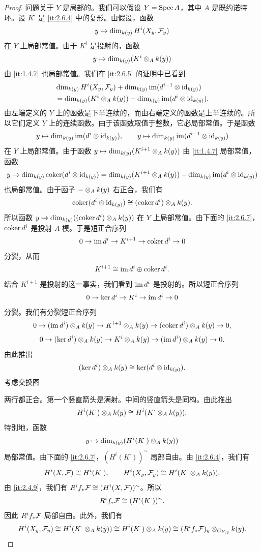 \begin{proof}
问题关于 $Y$ 是局部的。我们可以假设 $Y=\operatorname{Spec} A$，其中 $A$ 是既约诺特环。设 $K^\cdot$ 是 \ref{it:2.6.4} 中的复形。由假设，函数
\[
y\mapsto\dim_{k(y)}H^i(X_y,\mathcal{F}_y)
\]
在 $Y$ 上局部常值。由于 $K^i$ 是投射的，函数
\[
y\mapsto\dim_{k(y)}(K^i\otimes_A k(y))
\]
由 \ref{it:1.4.7} 也局部常值。我们在 \ref{it:2.6.5} 的证明中已看到
\begin{align*}
&\dim_{k(y)}H^i(X_y,\mathcal{F}_y)+\dim_{k(y)}\operatorname{im}(d^{i-1}\otimes\operatorname{id}_{k(y)})\\
&=\dim_{k(y)}(K^i\otimes_A k(y))-\dim_{k(y)}\operatorname{im}(d^i\otimes\operatorname{id}_{k(y)}).
\end{align*}
由左端定义的 $Y$ 上的函数是下半连续的，而由右端定义的函数是上半连续的。所以它们定义 $Y$ 上的连续函数。由于该函数取值于整数，它必局部常值。于是函数
\[
y\mapsto\dim_{k(y)}\operatorname{im}(d^i\otimes\operatorname{id}_{k(y)}),\qquad
y\mapsto\dim_{k(y)}\operatorname{im}(d^{i-1}\otimes\operatorname{id}_{k(y)})
\]
在 $Y$ 上局部常值。由于函数 $y\mapsto\dim_{k(y)}(K^{i+1}\otimes_A k(y))$ 由 \ref{it:1.4.7} 局部常值，函数
\[
y\mapsto\dim_{k(y)}\operatorname{coker}(d^i\otimes\operatorname{id}_{k(y)})
=\dim_{k(y)}(K^{i+1}\otimes_A k(y))-\dim_{k(y)}\operatorname{im}(d^i\otimes\operatorname{id}_{k(y)})
\]
也局部常值。由于函子 $-\otimes_A k(y)$ 右正合，我们有
\[
\operatorname{coker}(d^i\otimes\operatorname{id}_{k(y)})\cong(\operatorname{coker} d^i)\otimes_A k(y).
\]
所以函数 $y\mapsto\dim_{k(y)}((\operatorname{coker} d^i)\otimes_A k(y))$ 在 $Y$ 上局部常值。由下面的 \ref{it:2.6.7}，$\operatorname{coker} d^i$ 是投射 $A$-模。于是短正合序列
\[
0\to\operatorname{im} d^i\to K^{i+1}\to\operatorname{coker} d^i\to 0
\]
分裂，从而
\[
K^{i+1}\cong\operatorname{im} d^i\oplus\operatorname{coker} d^i.
\]
结合 $K^{i+1}$ 是投射的这一事实，我们看到 $\operatorname{im} d^i$ 是投射的。所以短正合序列
\[
0\to\ker d^i\to K^i\to\operatorname{im} d^i\to 0
\]
分裂。我们有分裂短正合序列
\[
0\to(\operatorname{im} d^i)\otimes_A k(y)\to K^{i+1}\otimes_A k(y)\to(\operatorname{coker} d^i)\otimes_A k(y)\to 0,
\]
\[
0\to(\ker d^i)\otimes_A k(y)\to K^i\otimes_A k(y)\to(\operatorname{im} d^i)\otimes_A k(y)\to 0.
\]
由此推出
\[
(\ker d^i)\otimes_A k(y)\cong\ker(d^i\otimes\operatorname{id}_{k(y)}).
\]
考虑交换图

\begin{center}
\end{center}

两行都正合。第一个竖直箭头是满射。中间的竖直箭头是同构。由此推出
\[
H^i(K^\cdot)\otimes_A k(y)\cong H^i(K^\cdot\otimes_A k(y)).
\]
特别地，函数
\[
y\mapsto\dim_{k(y)}(H^i(K^\cdot)\otimes_A k(y))
\]
局部常值。由下面的 \ref{it:2.6.7}，$(H^i(K^\cdot))^\sim$ 局部自由。由 \ref{it:2.6.4}，我们有
\[
H^i(X,\mathcal{F})\cong H^i(K^\cdot),\qquad H^i(X_y,\mathcal{F}_y)\cong H^i(K^\cdot\otimes_A k(y)).
\]
由 \ref{it:2.4.9}，我们有 $R^if_*\mathcal{F}\cong(H^i(X,\mathcal{F}))^\sim$。所以
\[
R^if_*\mathcal{F}\cong(H^i(K^\cdot))^\sim.
\]
因此 $R^if_*\mathcal{F}$ 局部自由。此外，我们有
\[
H^i(X_y,\mathcal{F}_y)\cong H^i(K^\cdot\otimes_A k(y))\cong H^i(K^\cdot)\otimes_A k(y)\cong(R^if_*\mathcal{F})_y\otimes_{\mathcal{O}_{Y,y}}k(y).
\]
\end{proof}


